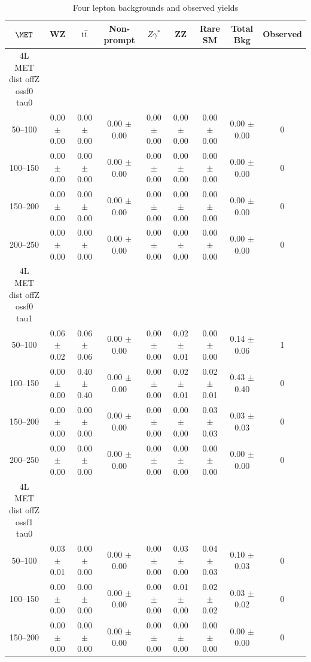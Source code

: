 \begin{table}
\tiny
\begin{center}
\caption{\label{tab:fourLeptonResults} Four lepton backgrounds and observed yields}
\begin{tabular}{|c|cccccc|c|c|}
\hline
\hline
$\MET$ & WZ & $\rm t\bar{t}$ &  Non-prompt & $Z\gamma^{*}$ & ZZ & Rare SM & Total Bkg & Observed \\
\hline
\hline
\hline
4L MET dist offZ ossf0 tau0\\
50--100 & 0.00 $\pm$ 0.00 & 0.00 $\pm$ 0.00 & 0.00 $\pm$ 0.00 & 0.00 $\pm$ 0.00 & 0.00 $\pm$ 0.00 & 0.00 $\pm$ 0.00 & 0.00 $\pm$ 0.00 & 0 \\
100--150 & 0.00 $\pm$ 0.00 & 0.00 $\pm$ 0.00 & 0.00 $\pm$ 0.00 & 0.00 $\pm$ 0.00 & 0.00 $\pm$ 0.00 & 0.00 $\pm$ 0.00 & 0.00 $\pm$ 0.00 & 0 \\
150--200 & 0.00 $\pm$ 0.00 & 0.00 $\pm$ 0.00 & 0.00 $\pm$ 0.00 & 0.00 $\pm$ 0.00 & 0.00 $\pm$ 0.00 & 0.00 $\pm$ 0.00 & 0.00 $\pm$ 0.00 & 0 \\
200--250 & 0.00 $\pm$ 0.00 & 0.00 $\pm$ 0.00 & 0.00 $\pm$ 0.00 & 0.00 $\pm$ 0.00 & 0.00 $\pm$ 0.00 & 0.00 $\pm$ 0.00 & 0.00 $\pm$ 0.00 & 0 \\
\hline
4L MET dist offZ ossf0 tau1\\
50--100 & 0.06 $\pm$ 0.02 & 0.06 $\pm$ 0.06 & 0.00 $\pm$ 0.00 & 0.00 $\pm$ 0.00 & 0.02 $\pm$ 0.01 & 0.00 $\pm$ 0.00 & 0.14 $\pm$ 0.06 & 1 \\
100--150 & 0.00 $\pm$ 0.00 & 0.40 $\pm$ 0.40 & 0.00 $\pm$ 0.00 & 0.00 $\pm$ 0.00 & 0.02 $\pm$ 0.01 & 0.02 $\pm$ 0.01 & 0.43 $\pm$ 0.40 & 0 \\
150--200 & 0.00 $\pm$ 0.00 & 0.00 $\pm$ 0.00 & 0.00 $\pm$ 0.00 & 0.00 $\pm$ 0.00 & 0.00 $\pm$ 0.00 & 0.03 $\pm$ 0.03 & 0.03 $\pm$ 0.03 & 0 \\
200--250 & 0.00 $\pm$ 0.00 & 0.00 $\pm$ 0.00 & 0.00 $\pm$ 0.00 & 0.00 $\pm$ 0.00 & 0.00 $\pm$ 0.00 & 0.00 $\pm$ 0.00 & 0.00 $\pm$ 0.00 & 0 \\
\hline
4L MET dist offZ ossf1 tau0\\
50--100 & 0.03 $\pm$ 0.01 & 0.00 $\pm$ 0.00 & 0.00 $\pm$ 0.00 & 0.00 $\pm$ 0.00 & 0.03 $\pm$ 0.00 & 0.04 $\pm$ 0.03 & 0.10 $\pm$ 0.03 & 0 \\
100--150 & 0.00 $\pm$ 0.00 & 0.00 $\pm$ 0.00 & 0.00 $\pm$ 0.00 & 0.00 $\pm$ 0.00 & 0.01 $\pm$ 0.00 & 0.02 $\pm$ 0.02 & 0.03 $\pm$ 0.02 & 0 \\
150--200 & 0.00 $\pm$ 0.00 & 0.00 $\pm$ 0.00 & 0.00 $\pm$ 0.00 & 0.00 $\pm$ 0.00 & 0.00 $\pm$ 0.00 & 0.00 $\pm$ 0.00 & 0.00 $\pm$ 0.00 & 0 \\

\end{tabular}
\end{center}
\end{table}
